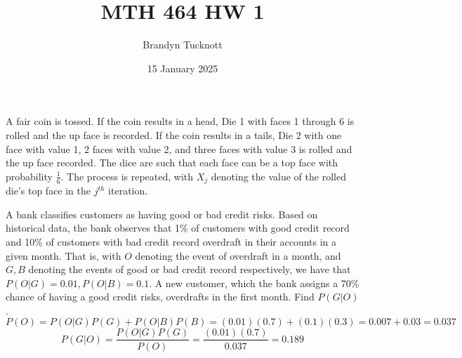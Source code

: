 \documentclass{exam}
\title{MTH 464 HW 1}
\author{Brandyn Tucknott}
\date{15 January 2025}
\begin{document}
\maketitle

\begin{questions}
    \question
A fair coin is tossed. If the coin results in a head, Die 1 with faces 1 through 6 is rolled and the up face is recorded. If the coin results in a tails, Die 2 with one face with value 1, 2 faces with value 2, and three faces with value 3 is rolled and the up face recorded. The dice are such that each face can be a top face with probability $\frac{1}{6}$. The process is repeated, with $X_j$ denoting the value of the rolled die's top face in the $j^{th}$ iteration.


\newpage
\question
A bank classifies customers as having good or bad credit risks. Based on historical data, the bank observes that 1\% of customers with good credit record and 10\% of customers with bad credit record overdraft in their accounts in a given month. That is, with $O$ denoting the event of overdraft in a month, and $G, B$ denoting the events of good or bad credit record respectively, we have that $P(O | G) = 0.01, P(O | B) = 0.1$.
\newline
A new customer, which the bank assigns a 70\% chance of having a good credit risks, overdrafts in the first month. Find $P(G | O)$.
\sol
$$P(O) = P(O | G)P(G) + P(O | B)P(B) = (0.01)(0.7) + (0.1)(0.3) = 0.007 + 0.03 = 0.037$$
$$P(G | O) = \frac{P(O | G)P(G)}{P(O)} = \frac{(0.01)(0.7)}{0.037} = 0.189$$


\end{questions}
\end{document}
